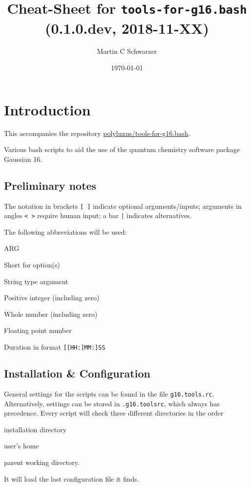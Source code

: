 \documentclass[   %
  final,          %
  a4paper,        %
  rscols=3,       %
  margin=1.0cm,   %
]{refsheet}
\title{Cheat-Sheet for \texttt{tools-for-g16.bash} (0.1.0.dev, 2018-11-XX)}
\author{Martin C Schwarzer}
\date{\today}
\begin{document}
\maketitle

\section{Introduction}

This accompanies the repository \href{https://github.com/polyluxus/tools-for-g16.bash}{polyluxus/tools-for-g16.bash}.

Various bash scripts to aid the use of the quantum chemistry software package Gaussian 16.

\subsection{Preliminary notes}

The notation in brackets \texttt{[ ]} indicate optional arguments/inputs;
arguments in angles \texttt{< >} require human input;
a bar \texttt{|} indicates alternatives.

The following abbreviations will be used:
\begin{rslisttt}{ARG}
  \item[opt] Short for option(s)
  \item[ARG] String type argument
  \item[INT] Positive integer (including zero)
  \item[NUM] Whole number (including zero)
  \item[FLT] Floating point number
  \item[DUR] Duration in format \texttt{[[HH:]MM:]SS} 
\end{rslisttt}

\subsection{Installation \& Configuration}

General settings for the scripts can be found in the file \texttt{g16.tools.rc}.
Alternatively, settings can be stored in \texttt{.g16.toolsrc}, 
which always has precedence.
Every script will check three different directories in the order
\begin{enumerate*}
\item installation directory
\item user's home
\item parent working directory.
\end{enumerate*}
It will load the last configuration file it finds.
\end{document}
